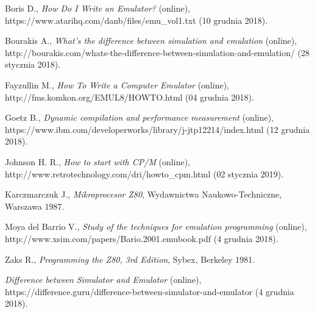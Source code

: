 \documentclass[12pt,a4paper]{report}
\begin{document}
	\leavevmode\newpage %
	
	
	
	
	
		
		
	
    
	\begin{flushleft}
	\begin{thebibliography}{99}
		Boris D., \emph{How Do I Write an Emulator?} (online),
		https://www.atarihq.com/danb/files/emu\_vol1.txt (10 grudnia 2018).
	
		Bourakis A.,
		\emph{What’s the difference between simulation and emulation} (online),
		http://bourakis.com/whats-the-difference-between-simulation-and-emulation/ (28 stycznia 2018).
	
		Fayzullin M., 
		\emph{How To Write a Computer Emulator} (online),
        http://fms.komkon.org/EMUL8/HOWTO.html
		(04 grudnia 2018).
		
		Goetz B., \emph{Dynamic compilation and performance measurement} (online),
		https://www.ibm.com/developerworks/library/j-jtp12214/index.html (12 grudnia 2018).
		
		Johnson H. R., \emph{How to start with CP/M} (online),
		http://www.retrotechnology.com/dri/howto\_cpm.html (02 stycznia 2019).

	    Karczmarczuk J., \emph{Mikroprocesor Z80}, Wydawnictwa Naukowo-Techniczne, Warszawa 1987.

		Moya del Barrio V.,
		\emph{Study of the techniques for emulation programming}  (online), http://www.xsim.com/papers/Bario.2001.emubook.pdf (4 grudnia 2018).
		
        
		Zaks R., \emph{Programming the Z80, 3rd Edition}, Sybex, Berkeley 1981.
        
        
        
        
        
        
        
		\emph{Difference between Simulator and Emulator} (online), https://difference.guru/difference-between-simulator-and-emulator (4 grudnia 2018).
        

\end{thebibliography}
\end{flushleft}
\end{document}

